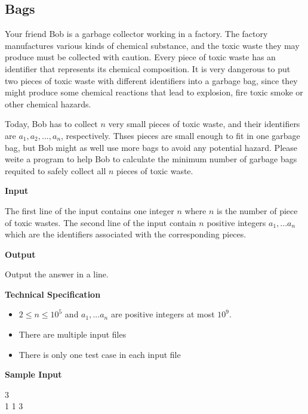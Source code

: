 \subsection{Bags}
Your friend Bob is a garbage collector working in a factory. The factory manufactures various kinds of chemical substance, and the toxic waste they may produce must be collected with caution. Every piece of toxic waste has an identifier that represents its chemical composition. It is very dangerous to put two pieces of toxic waste with different identifiers into a garbage bag, since they might produce some chemical reactions that lead to explosion, fire toxic smoke or other chemical hazards.

Today, Bob has to collect $n$ very small pieces of toxic waste, and their identifiers are $a_1, a_2,..., a_n$, respectively. Thses pieces are small enough to fit in one garbage bag, but Bob might as well use more bags to avoid any potential hazard. Please weite a program to help Bob to calculate the minimum number of garbage bags requited to safely collect all $n$ pieces of toxic waste.

\begin{flushleft}
{\color{red} \textbf{Input}}
\end{flushleft}
The first line of the input contains one integer $n$ where $n$ is the number of piece of toxic wastes. The second line of the input contain $n$ positive integers $a_1,...a_n$ which are the identifiers associated with the corresponding pieces.

\begin{flushleft}
{\color{red} \textbf{Output}}
\end{flushleft}
Output the answer in a line.

\begin{flushleft}
{\color{red} \textbf{Technical Specification}}
\end{flushleft}
\begin{itemize}
\item $2 \leq n \leq 10^5$ and $a_1,...a_n$ are positive integers at most $10^9$.
\item There are multiple input files
\item There is only one test case in each input file 
\end{itemize}

\begin{flushleft}
{\color{red} \textbf{Sample Input}}
\end{flushleft}
\begin{flushleft}
3\\
1 1 3\\
\end{flushleft}

